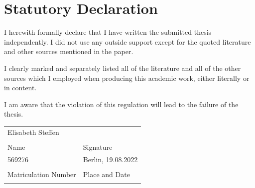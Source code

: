 \chapter*{Statutory Declaration}

I herewith formally declare that I have written the submitted thesis independently. I did not use any outside support except for the quoted literature and other sources mentioned in the paper.

\noindent
I clearly marked and separately listed all of the literature and all of the other sources which I employed when producing this academic work, either literally or in content.

\noindent
I am aware that the violation of this regulation will lead to the failure of the thesis.

\vspace{2cm}

\noindent
\begin{tabular}{@{}p{2.5in}p{2.5in}@{}}

Elisabeth Steffen &  \\
  \dotfill & \dotfill \\
  Name & Signature\\[5\bigskipamount]
  569276 & Berlin, 19.08.2022 \\
  \dotfill & \dotfill \\
  Matriculation Number &  Place and Date\\
  \centering
\end{tabular}